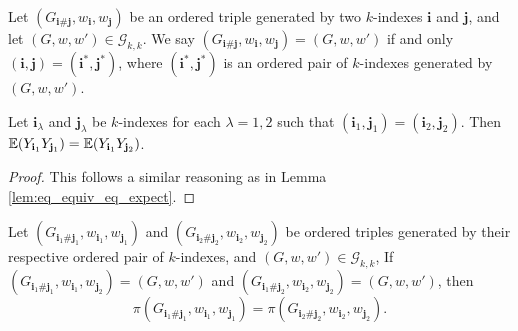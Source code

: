 \begin{definition}
  \notready
  \label{def:graph_walk_triple_rel}
  Let $(G_{\mathbf{i} \# \mathbf{j}},w_\mathbf{i},w_\mathbf{j})$ be an ordered triple generated by two $k$-indexes $\mathbf{i}$ and $\mathbf{j}$, and let $(G,w,w') \in \mathcal{G}_{k,k}$.
  We say $(G_{\mathbf{i} \# \mathbf{j}},w_\mathbf{i},w_\mathbf{j}) = (G,w,w')$ if and only $(\mathbf{i},\mathbf{j}) = (\mathbf{i}^*,\mathbf{j}^*)$,
  where $(\mathbf{i}^*,\mathbf{j}^*)$ is an ordered pair of $k$-indexes generated by $(G,w,w')$.
\end{definition}
\begin{lemma}
  \notready
  \label{lem:common_val_eq_of_index_pair_rel}
  Let $\mathbf{i}_\lambda$ and $\mathbf{j}_\lambda$ be $k$-indexes for each $\lambda=1,2$ such that $(\mathbf{i}_1,\mathbf{j}_1) = (\mathbf{i}_2,\mathbf{j}_2)$.
  Then $\mathbb{E} (Y_{\mathbf{i}_1}Y_{\mathbf{j}_1}) = \mathbb{E} (Y_{\mathbf{i}_1}Y_{\mathbf{j}_2})$.
\end{lemma}
\begin{proof}
  This follows a similar reasoning as in Lemma \ref{lem:eq_equiv_eq_expect}.
\end{proof}
\begin{lemma}
  \notready
  \label{lem:common_val_prod_eq_of_graph_walk_triple_rel}
  Let $(G_{\mathbf{i}_1 \# \mathbf{j}_1},w_{\mathbf{i}_1},w_{\mathbf{j}_1})$ and $(G_{\mathbf{i}_2 \# \mathbf{j}_2},w_{\mathbf{i}_2},w_{\mathbf{j}_2})$ be ordered triples generated by their respective ordered pair of $k$-indexes, and $(G,w,w') \in \mathcal{G}_{k,k}$,
  If $(G_{\mathbf{i}_1 \# \mathbf{j}_1},w_{\mathbf{i}_1},w_{\mathbf{j}_2}) = (G,w,w')$ and $(G_{\mathbf{i}_1 \# \mathbf{j}_2},w_{\mathbf{i}_2},w_{\mathbf{j}_2}) = (G,w,w')$, then
  \[
  \pi(G_{\mathbf{i}_1\#\mathbf{j}_1},w_{\mathbf{i}_1},w_{\mathbf{j}_1}) = \pi(G_{\mathbf{i}_2 \# \mathbf{j}_2},w_{\mathbf{i}_2},w_{\mathbf{j}_2}).
  \]
\end{lemma}
